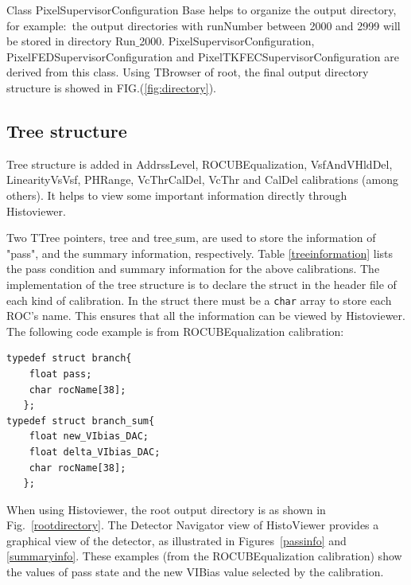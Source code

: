 
Class PixelSupervisorConfiguration Base helps to organize the output
directory, for example$:$ the output directories with runNumber
between 2000 and 2999 will be stored in directory
Run$\_$2000. PixelSupervisorConfiguration,
PixelFEDSupervisorConfiguration and PixelTKFECSupervisorConfiguration
are derived from this class. Using TBrowser of root, the final output
directory structure is showed in FIG.(\ref{fig:directory}). 

\subsection{Tree structure}\label{treestructure}

Tree structure is added in AddrssLevel, ROCUBEqualization,
VsfAndVHldDel, LinearityVsVsf, PHRange, VcThrCalDel, VcThr and CalDel
calibrations (among others). It helps to view some important information directly
through Histoviewer.

Two TTree pointers, tree and tree$\_$sum, are used to store
the information of "pass", and the
summary information, respectively. Table \ref{treeinformation} lists the pass
condition and summary information for the above
calibrations. The implementation of the tree structure is to declare
the struct in the header file of each kind of calibration. In the struct there must be a {\tt char} array to
store each ROC's name. This ensures that all the information can be
viewed by Histoviewer. 
The following code example is from
ROCUBEqualization calibration:
\begin{verbatim}
typedef struct branch{ 
    float pass; 
    char rocName[38];
   }; 
typedef struct branch_sum{
    float new_VIbias_DAC;
    float delta_VIbias_DAC;
    char rocName[38];
   };
\end{verbatim}

When using Histoviewer, the root output directory is as shown in
Fig.~\ref{rootdirectory}. The Detector Navigator view of HistoViewer
provides a graphical view of the detector, as illustrated in
Figures~\ref{passinfo} and \ref{summaryinfo}. These examples (from the
ROCUBEqualization calibration) show the values of pass state and the
new VIBias value selected by the calibration.



